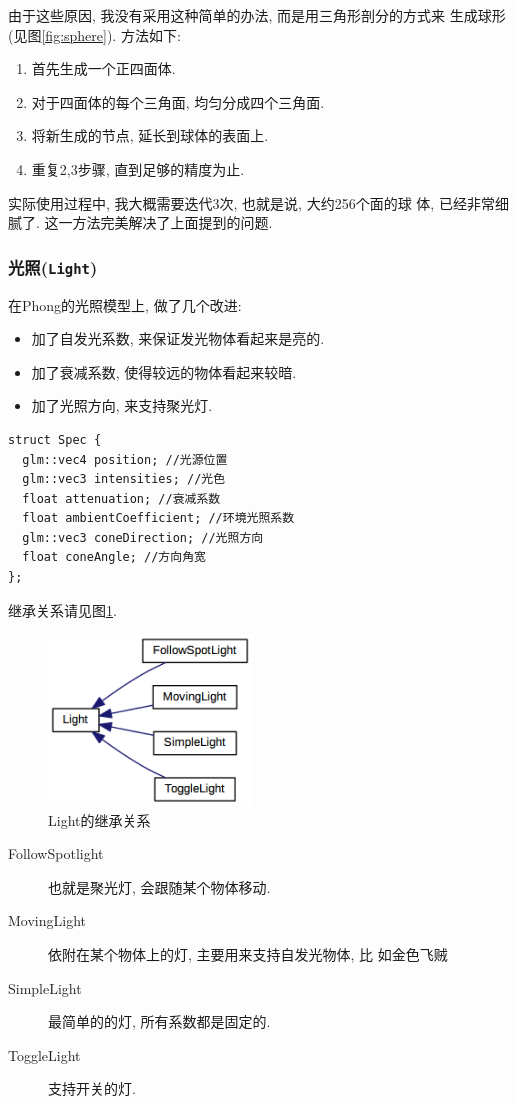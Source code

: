 \documentclass[11pt]{article}
\begin{document}
\begin{enumerate}
由于这些原因, 我没有采用这种简单的办法, 而是用三角形剖分的方式来
生成球形(见图\ref{fig:sphere}). 方法如下:
\begin{enumerate}
\item 首先生成一个正四面体.
\item 对于四面体的每个三角面, 均匀分成四个三角面.
\item 将新生成的节点, 延长到球体的表面上.
\item 重复2,3步骤, 直到足够的精度为止.
\end{enumerate}

实际使用过程中, 我大概需要迭代3次, 也就是说, 大约256个面的球
体, 已经非常细腻了. 这一方法完美解决了上面提到的问题.
\end{enumerate}
\subsubsection{光照(\texttt{Light})}
\label{sec-3-4-4}
在Phong的光照模型上, 做了几个改进:
\begin{itemize}
\item 加了自发光系数, 来保证发光物体看起来是亮的.
\item 加了衰减系数, 使得较远的物体看起来较暗.
\item 加了光照方向, 来支持聚光灯.
\end{itemize}
\begin{verbatim}
struct Spec {
  glm::vec4 position; //光源位置
  glm::vec3 intensities; //光色
  float attenuation; //衰减系数
  float ambientCoefficient; //环境光照系数
  glm::vec3 coneDirection; //光照方向
  float coneAngle; //方向角宽
};
\end{verbatim}
继承关系请见图\ref{fig:light_inherit}.

\begin{figure}[h]
\centering
\includegraphics[width=0.48\textwidth]{html/inherit_graph_8.png}
\caption{Light的继承关系}
\label{fig:light_inherit}
\end{figure}
\begin{description}
\item[{FollowSpotlight}] 也就是聚光灯, 会跟随某个物体移动.
\item[{MovingLight}] 依附在某个物体上的灯, 主要用来支持自发光物体, 比
如金色飞贼
\item[{SimpleLight}] 最简单的的灯, 所有系数都是固定的.
\item[{ToggleLight}] 支持开关的灯.
\end{description}
\end{document}
